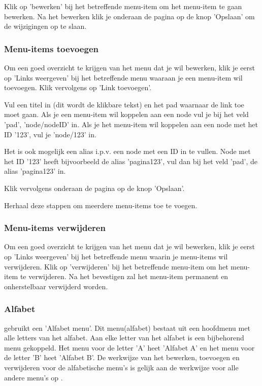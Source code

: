 Klik op 'bewerken' bij het betreffende menu-item om het menu-item te gaan bewerken. Na het bewerken klik je onderaan de pagina op de knop 'Opslaan' om de wijzigingen op te slaan.


\subsubsection{Menu-items toevoegen}\label{menuitemstoevoegen}

Om een goed overzicht te krijgen van het menu dat je wil bewerken, klik je eerst op 'Links weergeven' bij het betreffende menu waaraan je een menu-item wil toevoegen. Klik vervolgens op 'Link toevoegen'. 

Vul een titel in (dit wordt de klikbare tekst) en het pad waarnaar de link toe moet gaan. Als je een menu-item wil koppelen aan een node vul je bij het veld 'pad', 'node/nodeID' in. Als je het menu-item wil koppelen aan een node met het ID '123', vul je 'node/123' in. 

Het is ook mogelijk een alias i.p.v. een node met een ID in te vullen. Node met het ID '123' heeft bijvoorbeeld de alias 'pagina123', vul dan bij het veld 'pad', de alias 'pagina123' in. 

Klik vervolgens onderaan de pagina op de knop 'Opslaan'.

Herhaal deze stappen om meerdere menu-items toe te voegen.  

\subsubsection{Menu-items verwijderen}\label{menuitemsverwijderen}

Om een goed overzicht te krijgen van het menu dat je wil bewerken, klik je eerst op 'Links weergeven' bij het betreffende menu waarin je menu-items wil verwijderen. Klik op 'verwijderen' bij het betreffende menu-item om het menu-item te verwijderen. Na het bevestigen zal het menu-item permanent en onherstelbaar verwijderd worden.


\subsubsection{Alfabet}\label{alfabet}

\drupalpath gebruikt een 'Alfabet menu'. Dit menu(alfabet) bestaat uit een hoofdmenu met alle letters van het alfabet. Aan elke letter van het alfabet is een bijbehorend menu gekoppeld. Het menu voor de letter 'A' heet 'Alfabet A' en het menu voor de letter 'B' heet 'Alfabet B'. De werkwijze van het bewerken, toevoegen en verwijderen voor de alfabetische menu's is gelijk aan de werkwijze voor alle andere menu's op \drupalpath{}.

